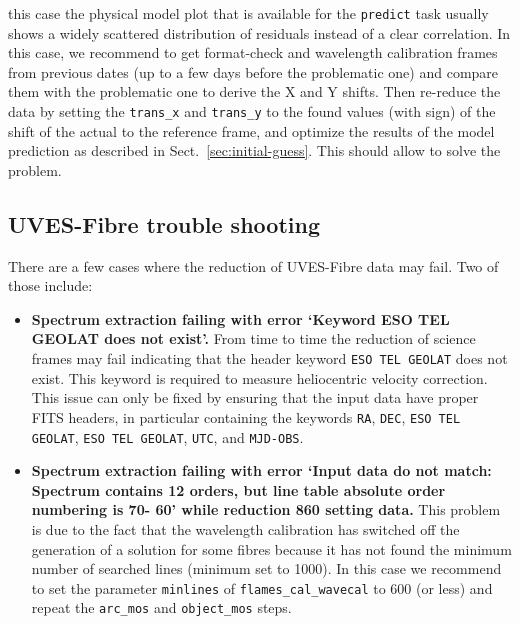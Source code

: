 \begin{itemize}
    this case the physical model plot that is available for the {\tt predict} task
    usually shows a widely 
    scattered distribution of residuals instead of a clear correlation. In this case, we
    recommend to get format-check and wavelength calibration frames from previous dates 
    (up to a few days before the problematic one) and compare them with the problematic one to 
    derive the X and Y shifts.
    Then re-reduce the data by setting the {\tt trans\_x} and {\tt trans\_y} to the found values 
    (with sign) of the shift of the actual to the reference frame, 
    and optimize the results of the model prediction as described in Sect.~\ref{sec:initial-guess}. 
    This should allow to solve the problem.
\end{itemize}

\subsection{UVES-Fibre trouble shooting}

There are a few cases where the reduction of UVES-Fibre data may fail. Two of those include:
\begin{itemize}
    \item \textbf{Spectrum extraction failing with error `Keyword ESO TEL GEOLAT does not exist'.}
    From time to time the reduction of science frames may fail indicating that the
    header keyword {\tt ESO TEL GEOLAT} does not exist. This keyword is required to measure heliocentric velocity correction. This issue can only be fixed by ensuring that
    the input data have proper FITS headers, in particular containing the keywords 
    {\tt RA}, {\tt DEC}, {\tt ESO TEL GEOLAT}, {\tt ESO TEL GEOLAT}, {\tt UTC}, and {\tt MJD-OBS}.
    \item \textbf{Spectrum extraction failing with error `Input data do not match: Spectrum contains 12 
    orders, but line table absolute order numbering is 70- 60' while reduction 860 setting data.} 
    This problem is due to the fact that the wavelength calibration has switched off the generation 
    of a solution for some fibres because it has not found the minimum number of searched lines
    (minimum set to 1000). In this case we
    recommend to set the parameter {\tt minlines} of {\tt flames\_cal\_wavecal} to 600 (or less)
    and repeat the {\tt arc\_mos} and {\tt object\_mos} steps.
\end{itemize}
